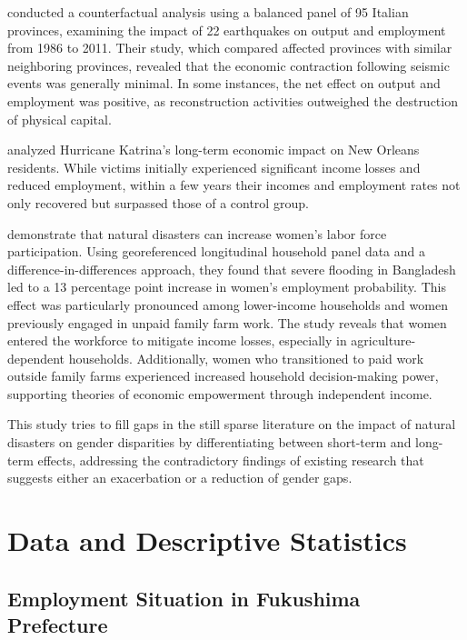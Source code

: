 \documentclass[12pt,halfline,a4paper]{ouparticle}
\begin{document}
 \citet{Porcelli2019TheItaly} conducted a counterfactual analysis using a balanced panel of 95 Italian provinces, examining the impact of 22 earthquakes on output and employment from 1986 to 2011. Their study, which compared affected provinces with similar neighboring provinces, revealed that the economic contraction following seismic events was generally minimal. In some instances, the net effect on output and employment was positive, as reconstruction activities outweighed the destruction of physical capital.

\citet{Deryugina2018TheReturns} analyzed Hurricane Katrina's long-term economic impact on New Orleans residents. While victims initially experienced significant income losses and reduced employment, within a few years their incomes and employment rates not only recovered but surpassed those of a control group.


\citet{Canessa2021WomensShocks} demonstrate that natural disasters can increase women's labor force participation. Using georeferenced longitudinal household panel data and a difference-in-differences approach, they found that severe flooding in Bangladesh led to a 13 percentage point increase in women's employment probability. This effect was particularly pronounced among lower-income households and women previously engaged in unpaid family farm work. The study reveals that women entered the workforce to mitigate income losses, especially in agriculture-dependent households. Additionally, women who transitioned to paid work outside family farms experienced increased household decision-making power, supporting theories of economic empowerment through independent income.



This study tries to fill gaps in the still sparse literature on the impact of natural disasters on gender disparities by differentiating between short-term and long-term effects, addressing the contradictory findings of existing research that suggests either an exacerbation or a reduction of gender gaps.


\section{Data and Descriptive Statistics}
\label{sec4}


\subsection{Employment Situation in Fukushima Prefecture}
\label{sec4.1}
\end{document}
